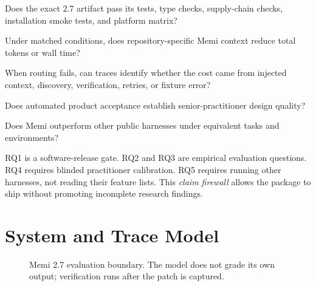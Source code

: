 \documentclass[10pt,twocolumn]{article}
\begin{document}
\begin{description}[style=nextline]
  \item[RQ1: Engineering readiness.] Does the exact 2.7 artifact pass its
  tests, type checks, supply-chain checks, installation smoke tests, and
  platform matrix?
  \item[RQ2: Efficiency.] Under matched conditions, does repository-specific
  Memi context reduce total tokens or wall time?
  \item[RQ3: Mechanism.] When routing fails, can traces identify whether the
  cost came from injected context, discovery, verification, retries, or
  fixture error?
  \item[RQ4: Quality.] Does automated product acceptance establish
  senior-practitioner design quality?
  \item[RQ5: Comparative performance.] Does Memi outperform other public
  harnesses under equivalent tasks and environments?
\end{description}

RQ1 is a software-release gate. RQ2 and RQ3 are empirical evaluation questions.
RQ4 requires blinded practitioner calibration. RQ5 requires running other
harnesses, not reading their feature lists. This \emph{claim firewall} allows
the package to ship without promoting incomplete research findings.

\section{System and Trace Model}

\begin{figure}[t]
\centering
{}
\caption{Memi 2.7 evaluation boundary. The model does not grade its own output;
verification runs after the patch is captured.}
\label{fig:pipeline}
\end{figure}
\end{document}
